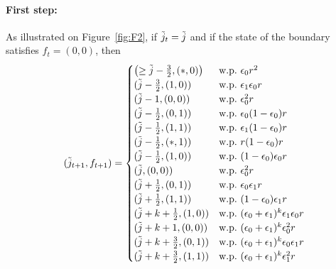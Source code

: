 \documentclass[11pt]{article}
\theoremstyle{plain}
\theoremstyle{definition}
\theoremstyle{remark}
\begin{document}
\paragraph{First step:}
As illustrated on Figure~\ref{fig:F2}, if $\Tilde{j}_{t} = \Tilde{j}$ and if the state of the boundary satisfies $f_t = (0,0)$, then
\begin{equation}
(\Tilde{j}_{t+1},f_{t+1}) =
  \begin{cases}
    \left(\geq \Tilde{j}-\frac{3}{2},(*,0)\right) & \text{w.p.\ } \epsilon_0r^2 \\
    (\Tilde{j}-\frac{3}{2} , (1,0)) & \text{w.p.\ } \epsilon_1 \epsilon_0 r \\
    (\Tilde{j}-1, (0,0)) & \text{w.p.\ } \epsilon_0^2 r \\
    (\Tilde{j}-\frac{1}{2}, (0,1)) & \text{w.p.\ } \epsilon_0(1-\epsilon_0)r \\
    (\Tilde{j}-\frac{1}{2} , (1,1)) & \text{w.p.\ } \epsilon_1(1-\epsilon_0)r \\
    (\Tilde{j}-\frac{1}{2} , (*,1)) & \text{w.p.\ } r(1-\epsilon_0)r \\
    (\Tilde{j}-\frac{1}{2} ,(1,0)) & \text{w.p.\ } (1-\epsilon_0) \epsilon_0 r \\
    (\Tilde{j},(0,0)) & \text{w.p.\ }\epsilon_0^2r \\
    (\Tilde{j}+\frac{1}{2},(0,1)) & \text{w.p.\ } \epsilon_0 \epsilon_1 r \\
    (\Tilde{j}+\frac{1}{2},(1,1)) & \text{w.p.\ } (1-\epsilon_0) \epsilon_1 r \\
    (\Tilde{j}+k+\frac{1}{2},(1,0)) & \text{w.p.\ } (\epsilon_0+\epsilon_1)^k \epsilon_1 \epsilon_0 r \\
    (\Tilde{j}+k+1 , (0,0)) & \text{w.p.\ } (\epsilon_0+\epsilon_1)^k \epsilon_0^2 r \\
    (\Tilde{j}+k+\frac{3}{2} , (0,1)) & \text{w.p.\ } (\epsilon_0+\epsilon_1)^k \epsilon_0 \epsilon_1 r \\
    (\Tilde{j}+k+\frac{3}{2}, (1,1)) & \text{w.p.\ } (\epsilon_0+\epsilon_1)^k \epsilon_1^2 r \\
  \end{cases} \label{eq:trans00}
\end{equation}
\end{document}
